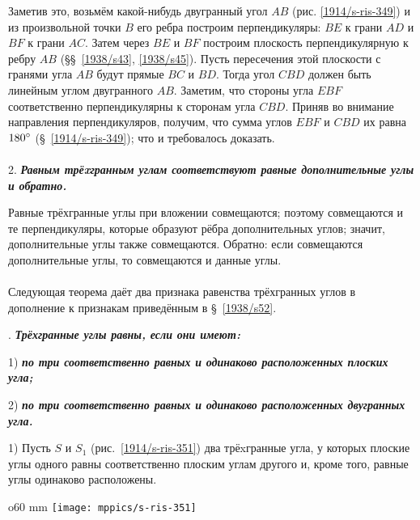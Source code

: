 Заметив это, возьмём какой-нибудь двугранный угол $AB$ (рис. \ref{1914/s-ris-349}) и из произвольной точки $B$ его ребра построим перпендикуляры: $BE$ к грани $AD$ и $BF$ к грани $AC$.
Затем через $BE$ и $BF$ построим плоскость перпендикулярную к ребру $AB$ (§§~\ref{1938/s43}, \ref{1938/s45}).
Пусть пересечения этой плоскости с гранями угла $AB$ будут прямые $BC$ и $BD$.
Тогда угол $CBD$ должен быть линейным углом двугранного $AB$.
Заметим, что стороны угла $EBF$ соответственно перпендикулярны к сторонам угла $CBD$.
Приняв во внимание направления перпендикуляров, получим, что сумма углов $EBF$ и $CBD$ их равна $180\degree$ (§~\ref{1914/s-ris-349}); что и требовалось доказать.

\paragraph{}\label{1914/401} 
 2. \textbf{\emph{Равным трёxгранным углам соответствуют равные дополнительные углы и обратно.}}

Равные трёхгранные углы при вложении совмещаются; поэтому совмещаются и те перпендикуляры, которые образуют рёбра дополнительных углов; значит, дополнительные углы также совмещаются.
Обратно: если совмещаются дополнительные углы, то совмещаются и данные углы.

\paragraph{}\label{1914/402}
Следующая теорема даёт два признака равенства трёхгранных углов в дополнение к признакам приведённым в §~\ref{1938/s52}.

\medskip

.
\textbf{\emph{Трёхгранные углы равны, если они имеют:}}

1) \textbf{\emph{по три соответственно равных и одинаково расположенных плоских угла;}}

2) \textbf{\emph{по три соответственно равных и одинаково расположенных двугранных угла.}} 

1) Пусть $S$ и $S_1$ (рис.~\ref{1914/s-ris-351}) два трёxгранные угла, у которых плоские углы одного равны соответственно плоским углам другого и, кроме того, равные углы одинаково расположены.

\begin{wrapfigure}{o}{60 mm}
\vskip-0mm
\centering
\texttt{[image: mppics/s-ris-351]}
\caption{}\label{1914/s-ris-351}
\end{wrapfigure}


